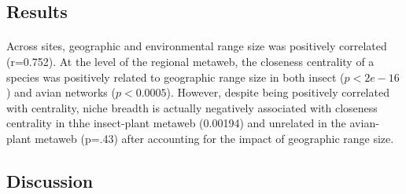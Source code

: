\documentclass[12pt]{article}
\begin{document}
 


\subsection*{Results}

\paragraph*{}
Across sites, geographic and environmental range size was positively correlated (r=0.752). At the level of the regional metaweb, the closeness centrality of a species was positively related to geographic range size in both insect ($p < 2e-16$) and avian networks ($p<0.0005$). However, despite being positively correlated with centrality, niche breadth is actually negatively associated with closeness centrality in thhe insect-plant metaweb (0.00194) and unrelated in the avian-plant metaweb (p=.43) after accounting for the impact of geographic range size. 


\paragraph*{}



\paragraph*{}






















\subsection*{Discussion}

\paragraph*{}



\paragraph*{}
\end{document}
